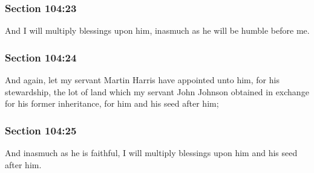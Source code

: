 	\subsubsection{Section 104:23} %
		\label{DC104-23}

		And I will multiply blessings upon him, inasmuch as he will be humble before me.


	\subsubsection{Section 104:24} %
		\label{DC104-24}

		And again, let my servant Martin Harris have appointed unto him, for his stewardship, the lot of land which my servant John Johnson obtained in exchange for his former inheritance, for him and his seed after him;


	\subsubsection{Section 104:25} %
		\label{DC104-25}

		And inasmuch as he is faithful, I will multiply blessings upon him and his seed after him.


